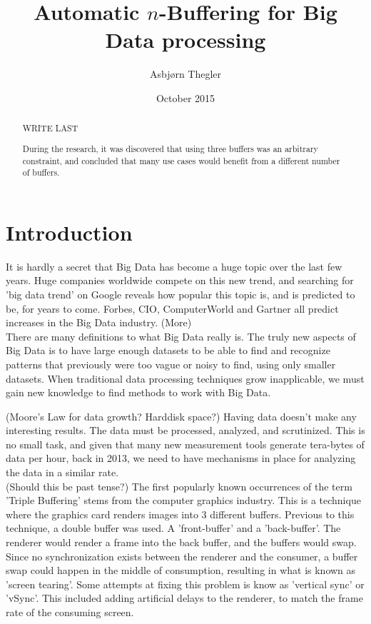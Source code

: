 \documentclass[a4paper]{article}
\title{Automatic $n$-Buffering for Big Data processing}
\author{Asbj\o rn Thegler}
\date{October 2015}
\begin{document}
\maketitle

\sloppy

\begin{abstract}
WRITE LAST

During the research, it was discovered that using three buffers was an arbitrary constraint, and
concluded that many use cases would benefit from a different number of buffers.
\end{abstract}

\tableofcontents






\section{Introduction}
It is hardly a secret that Big Data has become a huge topic over the last few years. Huge companies worldwide
compete on this new trend, and searching for 'big data trend' on Google reveals how popular this topic is, and is predicted to
be, for years to come. Forbes, CIO, ComputerWorld and Gartner all predict increases in the Big Data industry. (More)\\

There are many definitions to what Big Data really is. The truly new aspects of Big Data is to have large enough datasets to be able to find
and recognize patterns that previously were too vague or noisy to find, using only smaller datasets. When traditional data
processing techniques grow inapplicable, we must gain new knowledge to find methods to work with Big Data.

(Moore's Law for data growth? Harddisk space?)
Having data doesn't make any interesting results. The data must be processed, analyzed, and scrutinized. This is no small
task, and given that many new measurement tools generate tera-bytes of data per hour, back in 2013, we need to have mechanisms
in place for analyzing the data in a similar rate.\\


(Should this be past tense?)
The first popularly known occurrences of the term 'Triple Buffering' stems from the computer graphics industry.
This is a technique where the graphics card renders images into 3 different buffers. Previous to this technique, a double buffer
was used. A 'front-buffer' and a 'back-buffer'. The renderer would render a frame into the back buffer, and the buffers would swap. Since no
synchronization exists between the renderer and the consumer, a buffer swap could happen in the middle of consumption,
resulting in what is known as 'screen tearing'. Some attempts at fixing this problem is know as 'vertical sync' or 'vSync'.
This included adding artificial delays to the renderer, to match the frame rate of the consuming screen.
\end{document}
